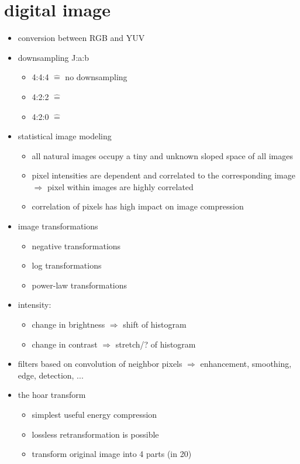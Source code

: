 \documentclass[a4paper,10pt]{scrreprt}
\begin{document}
\section{digital image}
\begin{itemize}
 \item conversion between RGB and YUV
 \item downsampling J:a:b
 \begin{itemize}
  \item 4:4:4 $\widehat{=}$ no downsampling
  \item 4:2:2 $\widehat{=}$ 
  \item 4:2:0 $\widehat{=}$ 
 \end{itemize}
 \item statistical image modeling 
 \begin{itemize}
  \item all natural images occupy a tiny and unknown sloped space of all images 
  \item pixel intensities are dependent and correlated to the corresponding image $\Rightarrow$ pixel within images are highly correlated 
  \item correlation of pixels has high impact on image compression
 \end{itemize}
 \item image transformations 
 \begin{itemize}
  \item negative transformations
  \item log transformations
  \item power-law transformations
 \end{itemize}
 \item intensity:
 \begin{itemize}
  \item change in brightness $\Rightarrow$ shift of histogram
  \item change in contrast $\Rightarrow$ stretch/? of histogram
 \end{itemize}
\item filters based on convolution of neighbor pixels $\Rightarrow$ enhancement, smoothing, edge, detection, ...
\item the hoar transform 
\begin{itemize}
 \item simplest useful energy compression
 \item lossless retransformation is possible 
 \item transform original image into 4 parts (in 20)

\end{itemize}
\end{itemize}
\end{document}
